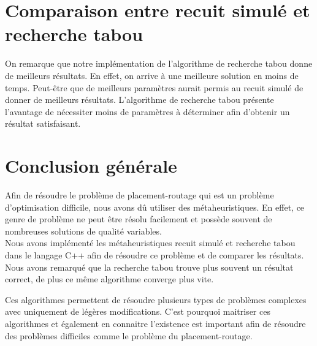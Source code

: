 \section{Comparaison entre recuit simulé et recherche tabou}
On remarque que notre implémentation de l'algorithme de recherche tabou donne de meilleurs résultats. En effet, on arrive à une meilleure solution en moins de temps. Peut-être que de meilleurs paramètres aurait permis au recuit simulé de donner de meilleurs résultats. L'algorithme de recherche tabou présente l'avantage de nécessiter moins de paramètres à déterminer afin d'obtenir un résultat satisfaisant.
\newpage

\section{Conclusion générale}

Afin de résoudre le problème de placement-routage qui est un problème d'optimisation difficile, nous avons dû utiliser des métaheuristiques. En effet, ce genre de problème
ne peut être résolu facilement et possède souvent de nombreuses solutions de qualité variables. \\

Nous avons implémenté les métaheuristiques recuit simulé et recherche tabou dans le langage C++ afin de résoudre ce problème et de comparer les résultats.\\

Nous avons remarqué que la recherche tabou trouve plus souvent un résultat correct, de plus ce même algorithme converge plus vite.

Ces algorithmes permettent de résoudre plusieurs types de problèmes complexes avec uniquement 
de légères modifications. C'est pourquoi maitriser ces algorithmes et également en connaitre l'existence est important afin de résoudre des problèmes difficiles comme le problème du placement-routage.

\newpage

